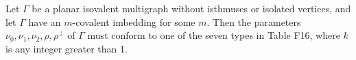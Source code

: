Let $\Gamma$ be a planar isovalent multigraph without isthmuses or isolated vertices, and let $\Gamma$ have an $m$-covalent imbedding for some $m$. Then the parameters $\nu_0, \nu_1, \nu_2, \rho, \rho^{\perp}$ of $\Gamma$ must conform to one of the seven types in Table F16, where $k$ is any integer greater than 1.
